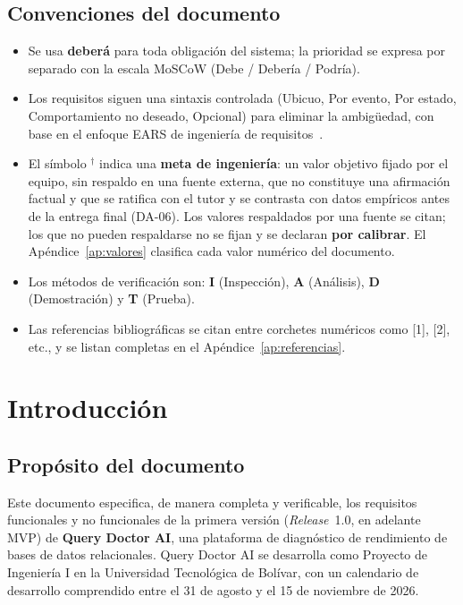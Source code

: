 \documentclass[11pt,a4paper]{report}
\newcommand{\dagsym}{\ensuremath{^{\dagger}}}
\begin{document}
\section*{Convenciones del documento}
\begin{itemize}[leftmargin=1.5em]
\item Se usa \textbf{deber\'a} para toda obligaci\'on del sistema; la prioridad se expresa por separado con la escala MoSCoW (Debe / Deber\'ia / Podr\'ia).
\item Los requisitos siguen una sintaxis controlada (Ubicuo, Por evento, Por estado, Comportamiento no deseado, Opcional) para eliminar la ambig\"uedad, con base en el enfoque EARS de ingenier\'ia de requisitos~\cite{R23}.
\item El s\'imbolo \dagsym{} indica una \textbf{meta de ingenier\'ia}: un valor objetivo fijado por el equipo, sin respaldo en una fuente externa, que no constituye una afirmaci\'on factual y que se ratifica con el tutor y se contrasta con datos emp\'iricos antes de la entrega final (DA-06). Los valores respaldados por una fuente se citan; los que no pueden respaldarse no se fijan y se declaran \textbf{por calibrar}. El Ap\'endice~\ref{ap:valores} clasifica cada valor num\'erico del documento.
\item Los m\'etodos de verificaci\'on son: \textbf{I} (Inspecci\'on), \textbf{A} (An\'alisis), \textbf{D} (Demostraci\'on) y \textbf{T} (Prueba).
\item Las referencias bibliogr\'aficas se citan entre corchetes num\'ericos como [1], [2], etc., y se listan completas en el Ap\'endice~\ref{ap:referencias}.
\end{itemize}

\tableofcontents
\listoftables
\listoffigures

\chapter{Introducci\'on}

\section{Prop\'osito del documento}

Este documento especifica, de manera completa y verificable, los requisitos funcionales y no funcionales de la primera versi\'on (\textit{Release}~1.0, en adelante MVP) de \textbf{Query Doctor AI}, una plataforma de diagn\'ostico de rendimiento de bases de datos relacionales. Query Doctor AI se desarrolla como Proyecto de Ingenier\'ia I en la Universidad Tecnol\'ogica de Bol\'ivar, con un calendario de desarrollo comprendido entre el 31 de agosto y el 15 de noviembre de 2026.
\end{document}
